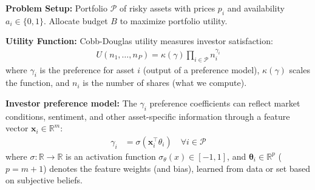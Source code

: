 \documentclass[aspectratio=169]{beamer}
\begin{document}
\begin{frame}
\textbf{Problem Setup:} Portfolio $\mathcal{P}$ of risky assets with prices $p_i$ and availability $a_i \in \{0,1\}$. Allocate budget $B$ to maximize portfolio utility.
\end{frame}

\begin{frame}
\textbf{Utility Function:} Cobb-Douglas utility measures investor satisfaction:
\begin{align*}
U(n_1, \dots, n_P) = \kappa(\gamma) \prod_{i \in \mathcal{P}} n_i^{\gamma_i}
\end{align*}
where $\gamma_i$ is the preference for asset $i$ (output of a preference model), $\kappa(\gamma)$ scales the function, and $n_i$ is the number of shares (what we compute).
\end{frame}

\begin{frame}
\textbf{Investor preference model:} The $\gamma_{i}$ preference coefficients can reflect market conditions, sentiment, and other asset-specific information through a feature vector $\mathbf{x}_{i}\in\mathbb{R}^{m}$:
\begin{align*}
\gamma_{i} & = \sigma\left(\mathbf{x}^{\top}_{i}\theta_{i}\right)\quad\forall{i}\in\mathcal{P}
\end{align*}
where $\sigma:\mathbb{R}\rightarrow\mathbb{R}$ is an activation function $\sigma_{\theta}(x)\in[-1,1]$,
and $\mathbf{\theta}_{i}\in\mathbb{R}^{p}$ ($p=m+1$) denotes the feature weights (and bias), learned from data or set based on subjective beliefs.
\end{frame}
\end{document}
